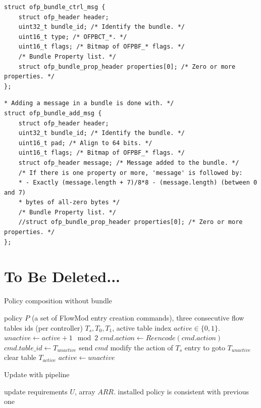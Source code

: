 \documentclass[conference]{sigcomm-alternate}
\begin{document}
\begin{appendix}
\begin{lstlisting}
struct ofp_bundle_ctrl_msg {
	struct ofp_header header;
	uint32_t bundle_id; /* Identify the bundle. */
	uint16_t type; /* OFPBCT_*. */
	uint16_t flags; /* Bitmap of OFPBF_* flags. */
	/* Bundle Property list. */
	struct ofp_bundle_prop_header properties[0]; /* Zero or more properties. */
};
\end{lstlisting}

\begin{lstlisting}
* Adding a message in a bundle is done with. */
struct ofp_bundle_add_msg {
	struct ofp_header header;
	uint32_t bundle_id; /* Identify the bundle. */
	uint16_t pad; /* Align to 64 bits. */
	uint16_t flags; /* Bitmap of OFPBF_* flags. */
	struct ofp_header message; /* Message added to the bundle. */
	/* If there is one property or more, 'message' is followed by:
	* - Exactly (message.length + 7)/8*8 - (message.length) (between 0 and 7)
	* bytes of all-zero bytes */
	/* Bundle Property list. */
	//struct ofp_bundle_prop_header properties[0]; /* Zero or more properties. */
};
\end{lstlisting}

\section{To Be Deleted...}

\begin{algorithm}[h]
    \caption{Policy composition without bundle}
    \label{alg:wobundle}
    \begin{algorithmic}[1]
    \Require policy $P$ (a set of FlowMod entry creation commands), three consecutive flow tables ids (per controller) $T_s,T_0,T_1$, active table index $active\in\{0,1\}$.
    \State $unactive \gets active + 1 \mod{2}$
	    \State $cmd.action\gets Reencode(cmd.action)$
	    \State $cmd.table\_id\gets T_{unactive}$
	    \State send $cmd$
    \EndFor
    \State modify the action of $T_s$ entry to goto $T_{unactive}$
    \State clear table $T_{active}$
    \State $active \gets unactive$
	\Return

    \end{algorithmic}
\end{algorithm}

\begin{algorithm}[h]
    \caption{Update with pipeline}
    \label{alg:pipeline}
    \begin{algorithmic}[1]
    \Require update requirements $U$, array $ARR$.
    \Ensure installed policy is consistent with previous one
			\Return


\end{algorithmic}
\end{algorithm}
\end{appendix}
\end{document}
